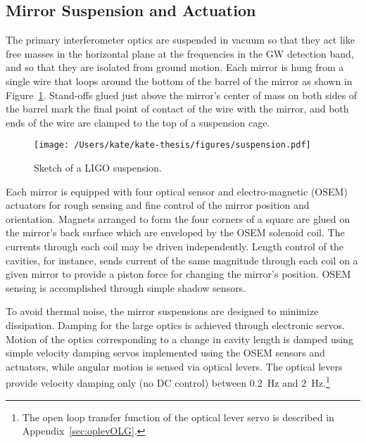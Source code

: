 



\subsection{Mirror Suspension and Actuation}
\label{sec:suspension}
The primary interferometer optics are suspended in vacuum so that they
act like free masses in the horizontal plane at the frequencies in the
GW detection band, and so that they are isolated from ground
motion. Each mirror is hung from a single wire that loops around the
bottom of the barrel of the mirror as shown in
Figure~\ref{fig:suspension}. Stand-offs glued just above the mirror's
center of mass on both sides of the barrel mark the final point of
contact of the wire with the mirror, and both ends of the wire are
clamped to the top of a suspension cage.

\begin{figure}
\begin{centering}
\texttt{[image: /Users/kate/kate-thesis/figures/suspension.pdf]}
\caption[Sketch of a LIGO suspension]{Sketch of a LIGO suspension.}
\label{fig:suspension}
\end{centering}
\end{figure}

Each mirror is equipped with four optical sensor and electro-magnetic
(OSEM) actuators for rough sensing and fine control of the mirror
position and orientation. Magnets arranged to form the four corners of
a square are glued on the mirror's back surface which are enveloped by
the OSEM solenoid coil.  The currents through each coil may be driven
independently.  Length control of the cavities, for instance, sends
current of the same magnitude through each coil on a given mirror to
provide a piston force for changing the mirror's position.  OSEM
sensing is accomplished through simple shadow sensors.

To avoid thermal noise, the mirror suspensions are designed to
minimize dissipation.  Damping for the large optics is achieved
through electronic servos.  Motion of the optics corresponding to a
change in cavity length is damped using simple velocity damping servos
implemented using the OSEM sensors and actuators, while angular motion
is sensed via optical levers.  The optical levers provide velocity
damping only (no DC control) between 0.2~Hz and 2~Hz.\footnote{ The
  open loop transfer function of the optical lever servo is described
  in Appendix~\ref{sec:oplevOLG}.} 

